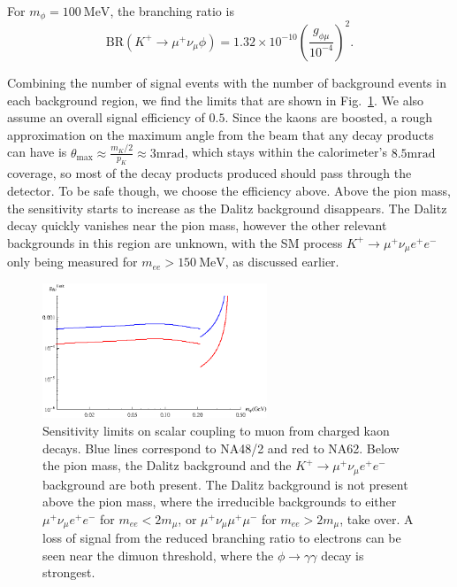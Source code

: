 \noindent For $m_\phi = 100~\textrm{MeV}$, the branching ratio is
\begin{equation}
    \textrm{BR}(K^+ \rightarrow \mu^+ \nu_\mu \phi) = 1.32\times 10^{-10} \left(\frac{g_{\phi\mu}}{10^{-4}}\right)^2\textrm{.}
\end{equation}

Combining the number of signal events with the number of background events in each background region, we find the limits that are shown in Fig.~\ref{fig:kaon_limits}.
We also assume an overall signal efficiency of $0.5$.
Since the kaons are boosted, a rough approximation on the maximum angle from the beam that any decay products can have is $\theta_\textrm{max} \approx \frac{m_K/2}{p_K} \approx 3\textrm{mrad}$, which stays within the calorimeter's $8.5\textrm{mrad}$ coverage, so most of the decay products produced should pass through the detector.
To be safe though, we choose the efficiency above.
Above the pion mass, the sensitivity starts to increase as the Dalitz background disappears.
The Dalitz decay quickly vanishes near the pion mass, however the other relevant backgrounds in this region are unknown, with the SM process $K^+ \rightarrow \mu^+ \nu_\mu e^+ e^-$ only being measured for $m_{ee} > 150~\textrm{MeV}$, as discussed earlier.

\begin{figure}[h]
    \centering
    \includegraphics[width=0.6\textwidth]{Figures/limits/kaon_all}
    \caption[Sensitivity limits on scalar coupling to muon from charged kaon decay.]{Sensitivity limits on scalar coupling to muon from charged kaon decays. Blue lines correspond to NA48/2 and red to NA62. Below the pion mass, the Dalitz background and the $K^+ \rightarrow \mu^+ \nu_\mu e^+ e^-$ background are both present. The Dalitz background is not present above the pion mass, where the irreducible backgrounds to either $\mu^+ \nu_\mu e^+ e^-$ for $m_{ee} < 2m_\mu$, or $\mu^+ \nu_\mu \mu^+ \mu^-$ for $m_{ee} > 2m_\mu$, take over. A loss of signal from the reduced branching ratio to electrons can be seen near the dimuon threshold, where the $\phi \rightarrow \gamma \gamma$ decay is strongest.}
    \label{fig:kaon_limits}
\end{figure}
